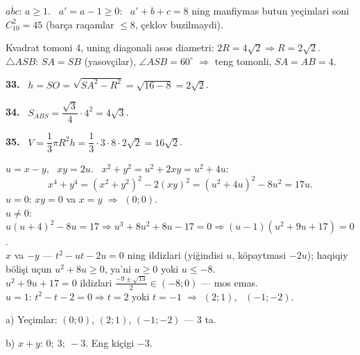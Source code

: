 $\overline{abc}$: $a\ge1$. \ $a'=a-1\ge0$: \ $a'+b+c=8$ ning manfiymas butun yeçimlari soni $C_{10}^2=45$ (barça raqamlar $\le8$, çeklov buzilmaydi).

\newpage
{}
Kvadrat tomoni 4, uning diagonali asos diametri: $2R=4\sqrt2\Rightarrow R=2\sqrt2$.\\
$\triangle ASB$: $SA=SB$ (yasovçilar), $\angle ASB=60^\circ$ $\Rightarrow$ teng tomonli, $SA=AB=4$.

\textbf{33.} \ $h=SO=\sqrt{SA^2-R^2}=\sqrt{16-8}=2\sqrt2$.

\textbf{34.} \ $S_{ABS}=\dfrac{\sqrt3}4\cdot4^2=4\sqrt3$.

\textbf{35.} \ $V=\dfrac13\pi R^2h=\dfrac13\cdot3\cdot8\cdot2\sqrt2=16\sqrt2$.

\newpage
{}
$u=x-y$, \ $xy=2u$. \ $x^2+y^2=u^2+2xy=u^2+4u$:
\[x^4+y^4=(x^2+y^2)^2-2(xy)^2=(u^2+4u)^2-8u^2=17u.\]
$u=0$: $xy=0$ va $x=y$ $\Rightarrow$ $(0;0)$. \\
$u\ne0$: $u(u+4)^2-8u=17\Rightarrow u^3+8u^2+8u-17=0\Rightarrow (u-1)(u^2+9u+17)=0$.\\
$x$ va $-y$ — $t^2-ut-2u=0$ ning ildizlari (yiğindisi $u$, köpaytmasi $-2u$); haqiqiy bölişi uçun $u^2+8u\ge0$, ya'ni $u\ge0$ yoki $u\le-8$.\\
$u^2+9u+17=0$ ildizlari $\frac{-9\pm\sqrt{13}}2\in(-8;0)$ — mos emas.\\
$u=1$: $t^2-t-2=0\Rightarrow t=2$ yoki $t=-1$ $\Rightarrow$ $(2;1)$, \ $(-1;-2)$.

a) Yeçimlar: $(0;0)$, $(2;1)$, $(-1;-2)$ — 3 ta.

b) $x+y$: $0;\ 3;\ -3$. Eng kiçigi $-3$.

